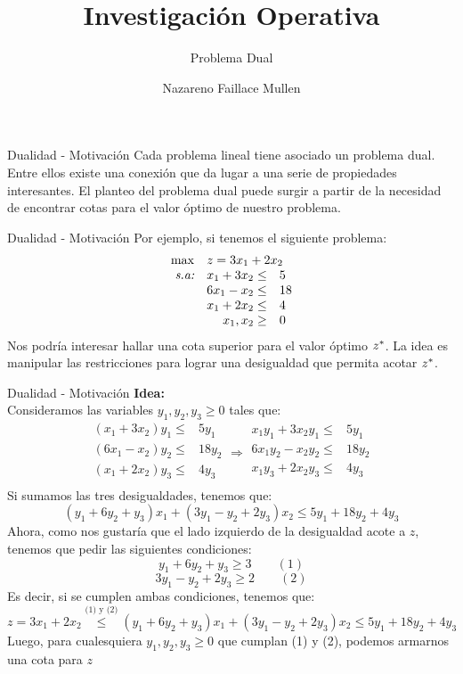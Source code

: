 \documentclass[10pt, aspectratio=169,usenames,dvipsnames]{beamer}
\title{Investigación Operativa}
\subtitle{Problema Dual}
\date{}
\author{Nazareno Faillace Mullen}
\begin{document}
\maketitle

\begin{frame}{Dualidad - Motivación}
Cada problema lineal tiene asociado un problema dual. Entre ellos existe una conexión que da lugar a una serie de propiedades interesantes.
\vskip 0.5cm
El planteo del problema dual puede surgir a partir de la necesidad de encontrar cotas para el valor óptimo de nuestro problema.
\end{frame}

\begin{frame}{Dualidad - Motivación}
Por ejemplo, si tenemos el siguiente problema:
\[
\begin{array}{rrl}
    \max & \multicolumn{2}{l}{z=3x_1 + 2x_2}  \\
    \textit{s.a:} & x_1+3x_2 \leq & 5 \\
     & 6x_1-x_2 \leq & 18 \\
     & x_1 + 2x_2 \leq & 4 \\
     & x_1,x_2 \geq & 0
\end{array}
\]
Nos podría interesar hallar una cota superior para el valor óptimo $z^{\ast}$. La idea es manipular las restricciones para lograr una desigualdad que permita acotar $z^{\ast}$.
\vskip 0.5cm

\end{frame}

\begin{frame}{Dualidad - Motivación}
    \small
    \textbf{Idea:}\\
    
    Consideramos las variables $y_1, y_2, y_3\geq 0$ tales que:
    \[
    \begin{array}{rl}
    (x_1+3x_2)y_1 \leq & 5y_1 \\
    (6x_1-x_2)y_2 \leq & 18y_2 \\
    (x_1 + 2x_2)y_3 \leq & 4y_3 \\
    \end{array}
    \Rightarrow
    \begin{array}{rl}
    x_1y_1+3x_2y_1 \leq & 5y_1 \\
    6x_1y_2-x_2y_2 \leq & 18y_2 \\
    x_1y_3 + 2x_2y_3 \leq & 4y_3 \\
    \end{array}
    \]
    Si sumamos las tres desigualdades, tenemos que:
    \[(y_1+6y_2+y_3)x_1+(3y_1-y_2+2y_3)x_2 \leq 5y_1+18y_2+4y_3 \]
    Ahora, como nos gustaría que el lado izquierdo de la desigualdad acote a $z$, tenemos que pedir las siguientes condiciones:
    \[ y_1+6y_2+y_3 \geq 3 \qquad (1) \]
    \[ 3y_1-y_2+2y_3 \geq 2 \qquad (2)\]
    Es decir, si se cumplen ambas condiciones, tenemos que:
    \[z=3x_1+2x_2\overset{\text{(1) y (2)}}\leq(y_1+6y_2+y_3)x_1+(3y_1-y_2+2y_3)x_2 \leq 5y_1+18y_2+4y_3 \]
    Luego, para cualesquiera $y_1,y_2,y_3\geq0$ que cumplan (1) y (2), podemos armarnos una cota para $z$
\end{frame}
\end{document}
